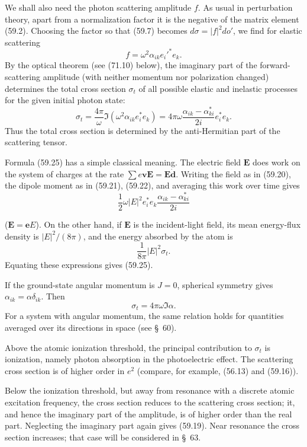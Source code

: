 We shall also need the photon scattering amplitude $f$. As usual in perturbation theory, apart from a normalization factor it is the negative of the matrix element (59.2). Choosing the factor so that (59.7) becomes $d\sigma=|f|^2do'$, we find for elastic scattering
\begin{equation}
f=\omega^2\alpha_{ik}e_i'^*e_k.
\tag{59.24}
\end{equation}
By the optical theorem (see (71.10) below), the imaginary part of the forward-scattering amplitude (with neither momentum nor polarization changed) determines the total cross section $\sigma_t$ of all possible elastic and inelastic processes for the given initial photon state:
\begin{equation}
\sigma_t=\frac{4\pi}{\omega}\Im(\omega^2\alpha_{ik}e_i^*e_k)
=4\pi\omega\frac{\alpha_{ik}-\alpha_{ki}^*}{2i}e_i^*e_k.
\tag{59.25}
\end{equation}
Thus the total cross section is determined by the anti-Hermitian part of the scattering tensor.

Formula (59.25) has a simple classical meaning. The electric field $\mathbf E$ does work on the system of charges at the rate $\sum e\mathbf v\mathbf E=\mathbf E\dot{\mathbf d}$. Writing the field as in (59.20), the dipole moment as in (59.21), (59.22), and averaging this work over time gives
\[
\frac12\omega|E|^2e_i^*e_k\frac{\alpha_{ik}-\alpha_{ki}^*}{2i}
\]

($\mathbf E=\mathbf eE$). On the other hand, if $\mathbf E$ is the incident-light field, its mean energy-flux density is $|E|^2/(8\pi)$, and the energy absorbed by the atom is
\[
\frac1{8\pi}|E|^2\sigma_t.
\]
Equating these expressions gives (59.25).

If the ground-state angular momentum is $J=0$, spherical symmetry gives $\alpha_{ik}=\alpha\delta_{ik}$. Then
\begin{equation}
\sigma_t=4\pi\omega\Im\alpha.
\tag{59.26}
\end{equation}
For a system with angular momentum, the same relation holds for quantities averaged over its directions in space (see \S~60).

Above the atomic ionization threshold, the principal contribution to $\sigma_t$ is ionization, namely photon absorption in the photoelectric effect. The scattering cross section is of higher order in $e^2$ (compare, for example, (56.13) and (59.16)).

Below the ionization threshold, but away from resonance with a discrete atomic excitation frequency, the cross section reduces to the scattering cross section; it, and hence the imaginary part of the amplitude, is of higher order than the real part. Neglecting the imaginary part again gives (59.19). Near resonance the cross section increases; that case will be considered in \S~63.

